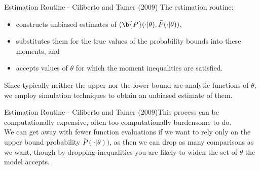 \begin{frame}{Estimation Routine - Ciliberto and Tamer (2009)}
The estimation routine:
\begin{itemize}
\item constructs unbiased estimates of $(\b{P}(\cdot|\theta),\bar{P}(\cdot|\theta))$, 
\item substitutes them for the true values of the probability bounds into these moments, and
\item accepts values of  $\theta$ for which the moment inequalities are satisfied.
\end{itemize}
\vspace{0.1in}
Since typically neither the upper nor the lower bound are
analytic functions of $\theta$, we employ simulation techniques to obtain an unbiased estimate of them.\\
\vspace{0.2in}
\end{frame}
\begin{frame}{Estimation Routine - Ciliberto and Tamer (2009)}This process can be computationally expensive, often too computationally burdensome
to do. \\
\vspace{0.2in}
We can get away with fewer function evaluations if
we want to rely only on the upper bound probability $\bar{P}( \cdot | \theta))$, as
then we can drop as many comparisons as we want, though by
dropping inequalities you are likely to widen the set of  $\theta$ the
model accepts.
\end{frame}

